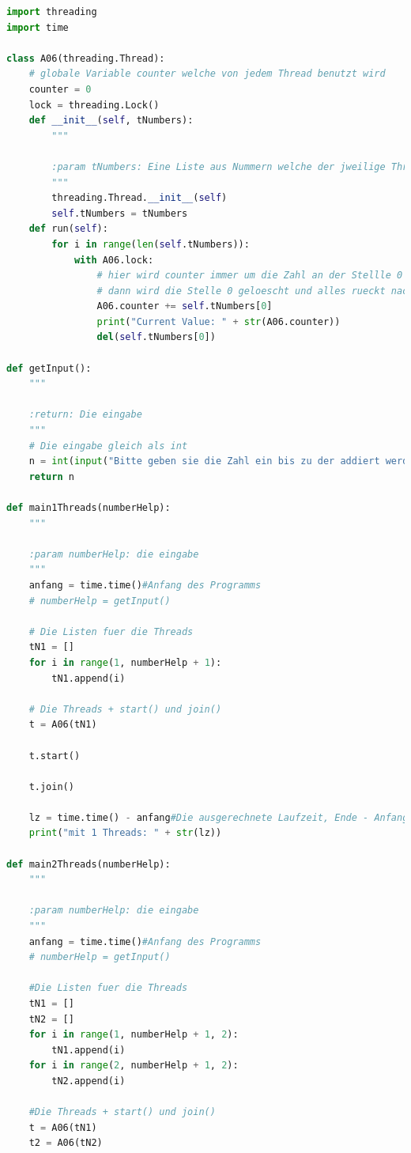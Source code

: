 \begin{lstlisting}[language=python]
import threading
import time

class A06(threading.Thread):
    # globale Variable counter welche von jedem Thread benutzt wird
    counter = 0
    lock = threading.Lock()
    def __init__(self, tNumbers):
        """

        :param tNumbers: Eine Liste aus Nummern welche der jweilige Thread zo counter dazu addieren soll
        """
        threading.Thread.__init__(self)
        self.tNumbers = tNumbers
    def run(self):
        for i in range(len(self.tNumbers)):
            with A06.lock:
                # hier wird counter immer um die Zahl an der Stellle 0 der liste erhoeht
                # dann wird die Stelle 0 geloescht und alles rueckt nach links(2 -> 1, 1 -> 0, etc.)
                A06.counter += self.tNumbers[0]
                print("Current Value: " + str(A06.counter))
                del(self.tNumbers[0])

def getInput():
    """

    :return: Die eingabe
    """
    # Die eingabe gleich als int
    n = int(input("Bitte geben sie die Zahl ein bis zu der addiert werden soll."))
    return n

def main1Threads(numberHelp):
    """

    :param numberHelp: die eingabe
    """
    anfang = time.time()#Anfang des Programms
    # numberHelp = getInput()

    # Die Listen fuer die Threads
    tN1 = []
    for i in range(1, numberHelp + 1):
        tN1.append(i)

    # Die Threads + start() und join()
    t = A06(tN1)

    t.start()

    t.join()

    lz = time.time() - anfang#Die ausgerechnete Laufzeit, Ende - Anfang
    print("mit 1 Threads: " + str(lz))

def main2Threads(numberHelp):
    """

    :param numberHelp: die eingabe
    """
    anfang = time.time()#Anfang des Programms
    # numberHelp = getInput()

    #Die Listen fuer die Threads
    tN1 = []
    tN2 = []
    for i in range(1, numberHelp + 1, 2):
        tN1.append(i)
    for i in range(2, numberHelp + 1, 2):
        tN2.append(i)

    #Die Threads + start() und join()
    t = A06(tN1)
    t2 = A06(tN2)


\end{lstlisting}

